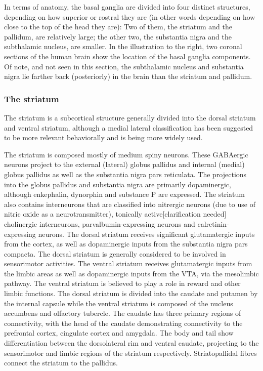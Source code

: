 \documentclass[]{book}
\begin{document}
In terms of anatomy, the basal ganglia are divided into four distinct structures, depending on how superior or rostral they are (in other words depending on how close to the top of the head they are): Two of them, the striatum and the pallidum, are relatively large; the other two, the substantia nigra and the subthalamic nucleus, are smaller. In the illustration to the right, two coronal sections of the human brain show the location of the basal ganglia components. Of note, and not seen in this section, the subthalamic nucleus and substantia nigra lie farther back (posteriorly) in the brain than the striatum and pallidum.

\hypertarget{the-striatum}{%
\subsubsection{The striatum}\label{the-striatum}}

The striatum is a subcortical structure generally divided into the dorsal striatum and ventral striatum, although a medial lateral classification has been suggested to be more relevant behaviorally and is being more widely used.

The striatum is composed mostly of medium spiny neurons. These GABAergic neurons project to the external (lateral) globus pallidus and internal (medial) globus pallidus as well as the substantia nigra pars reticulata. The projections into the globus pallidus and substantia nigra are primarily dopaminergic, although enkephalin, dynorphin and substance P are expressed. The striatum also contains interneurons that are classified into nitrergic neurons (due to use of nitric oxide as a neurotransmitter), tonically active{[}clarification needed{]} cholinergic interneurons, parvalbumin-expressing neurons and calretinin-expressing neurons. The dorsal striatum receives significant glutamatergic inputs from the cortex, as well as dopaminergic inputs from the substantia nigra pars compacta. The dorsal striatum is generally considered to be involved in sensorimotor activities. The ventral striatum receives glutamatergic inputs from the limbic areas as well as dopaminergic inputs from the VTA, via the mesolimbic pathway. The ventral striatum is believed to play a role in reward and other limbic functions. The dorsal striatum is divided into the caudate and putamen by the internal capsule while the ventral striatum is composed of the nucleus accumbens and olfactory tubercle. The caudate has three primary regions of connectivity, with the head of the caudate demonstrating connectivity to the prefrontal cortex, cingulate cortex and amygdala. The body and tail show differentiation between the dorsolateral rim and ventral caudate, projecting to the sensorimotor and limbic regions of the striatum respectively. Striatopallidal fibres connect the striatum to the pallidus.
\end{document}

